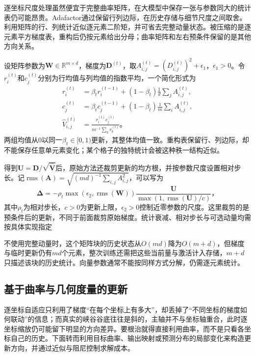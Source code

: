 逐坐标尺度处理虽然便宜于完整曲率矩阵，在大模型中保存一张与参数同大的统计表仍可能昂贵。Adafactor通过保留行列边际，在历史存储与细节尺度之间取舍。利用矩阵的行、列统计近似逐元素二阶矩，并可省去完整动量状态。被压缩的是逐元素平方梯度表，重构后仍按元素给出分母；曲率矩阵和左右预条件保留的是其他方向关系。

设矩阵参数为$\bm W\in\mathbb R^{m\times d}$，梯度为$\bm D^{(t)}$，取$A_{i,j}^{(t)}=(D_{i,j}^{(t)})^2+\epsilon_1$，$\epsilon_1>0$。令$r_i^{(t)}$和$c_j^{(t)}$分别为行均值与列均值的指数平均，一个简化形式为
\begin{align}
  r_i^{(t)}&=\beta_t r_i^{(t-1)}+(1-\beta_t)\frac1d\sum_j A_{i,j}^{(t)},\\
  c_j^{(t)}&=\beta_t c_j^{(t-1)}+(1-\beta_t)\frac1m\sum_i A_{i,j}^{(t)},\\
  \hat V_{i,j}^{(t)}&=\frac{r_i^{(t)}c_j^{(t)}}{m^{-1}\sum_k r_k^{(t)}}\text{。}
  \label{eq:training-adafactor-factorization}
\end{align}
两组均值从0以同一$\beta_t\in[0,1)$更新，其整体均值一致。重构表保留行、列边际，却不能保存任意单元素变化；某个格子的独特统计会被这种秩一结构近似。

得到$\bm U=\bm D/\sqrt{\hat{\bm V}}$后，原始方法还裁剪更新的均方根，并按参数尺度设置相对步长。记$\operatorname{rms}(\bm A)=\sqrt{(md)^{-1}\sum_{i,j}A_{i,j}^2}$，可以写为
\begin{equation}
  \bm\Delta=-\rho_t\max(\epsilon_2,\operatorname{rms}(\bm W))
    \frac{\bm U}{\max(1,\operatorname{rms}(\bm U)/c)}\text{，}
  \label{eq:training-adafactor-update}
\end{equation}
其中$\rho_t$为相对步长，$c>0$为更新上限，$\epsilon_2>0$控制近零参数的尺度。这里裁剪的是预条件后的更新，不同于前面裁剪原始梯度。统计衰减、相对步长与可选动量均需按具体实现指定

不使用完整动量时，这个矩阵块的历史状态从$O(md)$降为$O(m+d)$，但梯度与临时更新仍有$md$个元素，整次训练还需把这些当前量与激活计入存储，$m+d$只描述该块的历史统计。向量参数通常不能按同样方式分解，仍需逐元素统计。

\subsection{基于曲率与几何度量的更新}
\label{sec:training-geometric-updates}

逐坐标自适应只利用了梯度“在每个坐标上有多大”，却丢掉了“不同坐标的梯度如何联动”的信息；而真实的峡谷谷底往往是斜的，主轴并不与坐标轴重合，此时逐坐标缩放仍可能留下明显的方向差异。要根治就得直接利用曲率，而不是只看各坐标自己的历史。下面转而利用目标曲率、输出映射或预测分布的局部变化来构造更新方向，并通过近似与阻尼控制求解成本。

